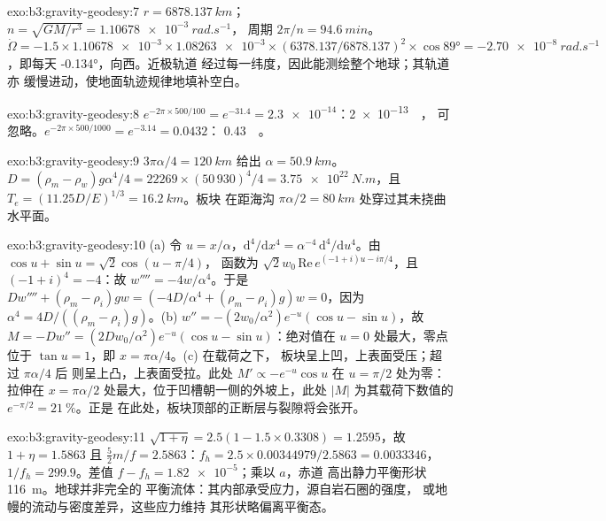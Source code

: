 \begin{solution}{exo:b3:gravity-geodesy:7}
$r = \qty{6878.137}{km}$；$n = \sqrt{GM/r^3} = \qty{1.10678e-3}{rad.s^{-1}}$，
周期 $2\pi/n = \qty{94.6}{min}$。$\dot\Omega = -1.5\times\num{1.10678e-3}
\times\num{1.08263e-3}\times(6378.137/6878.137)^2\times\cos\ang{89} =
\qty{-2.70e-8}{rad.s^{-1}}$，即每天 \ang{-0.134}，向西。近极轨道
经过每一纬度，因此能测绘整个地球；其轨道亦
缓慢进动，使地面轨迹规律地填补空白。
\end{solution}

\begin{solution}{exo:b3:gravity-geodesy:8}
$e^{-2\pi\times500/100} = e^{-31.4} = \num{2.3e-14}$：\qty{2e-13}{\milli\gal}，
可忽略。$e^{-2\pi\times500/1000} = e^{-3.14} = 0.0432$：
\qty{0.43}{\milli\gal}。
\end{solution}

\begin{solution}{exo:b3:gravity-geodesy:9}
$3\pi\alpha/4 = \qty{120}{km}$ 给出 $\alpha = \qty{50.9}{km}$。
$D = (\rho_m - \rho_w)g\alpha^4/4 = 22269\times(50\,930)^4/4 =
\qty{3.75e22}{N.m}$，且 $T_e = (11.25D/E)^{1/3} = \qty{16.2}{km}$。板块
在距海沟 $\pi\alpha/2 = \qty{80}{km}$ 处穿过其未挠曲水平面。
\end{solution}

\begin{solution}{exo:b3:gravity-geodesy:10}
(a) 令 $u = x/\alpha$，$\mathrm d^4/\mathrm dx^4 = \alpha^{-4}\,\mathrm
d^4/\mathrm du^4$。由 $\cos u + \sin u = \sqrt2\cos(u - \pi/4)$，
函数为 $\sqrt2w_0\,\mathrm{Re}\,e^{(-1 + i)u - i\pi/4}$，且
$(-1 + i)^4 = -4$：故 $w'''' = -4w/\alpha^4$。于是 $Dw'''' + (\rho_m -
\rho_i)gw = (-4D/\alpha^4 + (\rho_m - \rho_i)g)w = 0$，因为 $\alpha^4 =
4D/((\rho_m - \rho_i)g)$。(b) $w'' = -(2w_0/\alpha^2)e^{-u}(\cos u - \sin u)$，故
$M = -Dw'' = (2Dw_0/\alpha^2)e^{-u}(\cos u - \sin u)$：绝对值在
$u = 0$ 处最大，零点位于 $\tan u = 1$，即 $x = \pi\alpha/4$。(c) 在载荷之下，
板块呈上凹，上表面受压；超过 $\pi\alpha/4$ 后
则呈上凸，上表面受拉。此处 $M' \propto
-e^{-u}\cos u$ 在 $u = \pi/2$ 处为零：拉伸在
$x = \pi\alpha/2$ 处最大，位于凹槽朝一侧的外坡上，此处
$|M|$ 为其载荷下数值的 $e^{-\pi/2} = \qty{21}{\percent}$。正是
在此处，板块顶部的正断层与裂隙将会张开。
\end{solution}

\begin{solution}{exo:b3:gravity-geodesy:11}
$\sqrt{1 + \eta} = 2.5(1 - 1.5\times0.3308) = 1.2595$，故 $1 + \eta = 1.5863$
且 $\tfrac52m/f = 2.5863$：$f_h = 2.5\times0.00344979/2.5863 = \num{0.0033346}$，
$1/f_h = 299.9$。差值 $f - f_h = \num{1.82e-5}$；乘以 $a$，赤道
高出静力平衡形状 \qty{116}{m}。地球并非完全的
平衡流体：其内部承受应力，源自岩石圈的强度，
或地幔的流动与密度差异，这些应力维持
其形状略偏离平衡态。
\end{solution}

